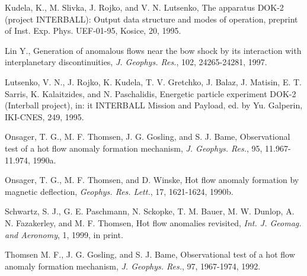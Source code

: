\documentclass[11pt]{article}
\begin{document}
\begin{article}
\begin{thebibliography}{}
Kudela, K., M. Slivka, J. Rojko, and V. N. Lutsenko, The
apparatus DOK-2 (project INTERBALL): Output data structure and
modes of operation, preprint of Inst. Exp. Phys. UEF-01-95,
Kosice, 20, 1995.

Lin Y., Generation of anomalous flows near the bow shock by
its interaction with interplanetary discontinuities, {\it J. Geophys.
Res.}, 102, 24265-24281, 1997.

Lutsenko, V. N., J. Rojko, K. Kudela, T. V. Gretchko, J. Balaz,
J. Matisin, E. T. Sarris, K. Kalaitzides, and N. Paschalidis,
Energetic particle experiment DOK-2 (Interball project), in:
{it INTERBALL Mission and Payload,} ed. by Yu. Galperin, IKI-CNES,
249, 1995.


Onsager, T. G., M. F. Thomsen, J. G. Gosling, and S. J.
Bame, Observational test of a hot flow anomaly formation
mechanism, {\it J. Geophys. Res.}, 95, 11.967-11.974, 1990a.

Onsager, T. G., M. F. Thomsen, and D. Winske,
Hot flow anomaly formation by magnetic deflection,
{\it Geophys. Res. Lett.}, 17, 1621-1624, 1990b.

Schwartz, S. J., G. E. Paschmann, N. Sckopke, T. M. Bauer, M. W.
Dunlop, A. N. Fazakerley, and M. F. Thomsen,  Hot flow anomalies
revisited, {\it Int. J. Geomag. and Aeronomy}, 1, 1999, in print.

Thomsen M. F., J. G. Gosling, and S. J.
Bame, Observational test of a hot flow anomaly formation
mechanism, {\it J. Geophys. Res.}, 97, 1967-1974, 1992.


\end{thebibliography}


\end{article}
\end{document}
